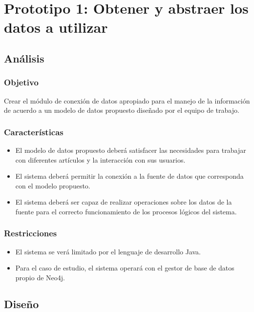 \chapter{Prototipo 1: Obtener y abstraer los datos a utilizar}
\section{Análisis}
\subsection{Objetivo}
Crear el módulo de conexión de datos apropiado para el manejo de la información de acuerdo a un modelo de datos propuesto diseñado por el equipo de trabajo.

\subsection{Características}
\begin{itemize}
	\item El modelo de datos propuesto deberá satisfacer las necesidades para trabajar con diferentes artículos y la interacción con sus usuarios.
	\item El sistema deberá permitir la conexión a la fuente de datos que corresponda con el modelo propuesto.
	\item El sistema deberá ser capaz de realizar operaciones sobre los datos de la fuente para el correcto funcionamiento de los procesos lógicos del sistema.
\end{itemize}

\subsection{Restricciones}
\begin{itemize}
	\item El sistema se verá limitado por el lenguaje de desarrollo Java.
	\item Para el caso de estudio, el sistema operará con el gestor de base de datos propio de Neo4j. 
\end{itemize}

\section{Diseño}
